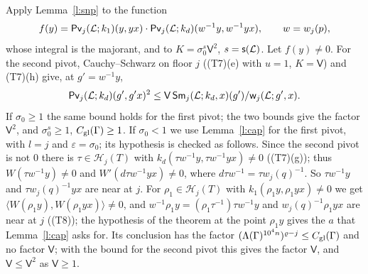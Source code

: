 \documentclass[11pt,a4paper]{article}
\makeatletter
\theoremstyle{plainx}
\theoremstyle{uprightx}
\renewenvironment{proof}[1][Proof]{\par\pushQED{\qed}\normalfont\topsep0pt\partopsep0pt
  \trivlist\item[\hskip\labelsep\itshape #1.]\ignorespaces}{\popQED\endtrivlist\@endpefalse}
\newcommand{\cL}{\mathcal{L}}
\newcommand{\Hl}[2]{\mathcal{H}_{#1}(#2)}
\newcommand{\wl}[2]{w_{#1}(#2)}
\newcommand{\ip}[2]{\langle #1,#2\rangle}
\newcommand{\Inp}[1]{\textup{(#1)}}
\makeatother
\begin{document}
\begin{proof}[Proof of Theorem A\textup{(a)}]
Apply Lemma~\ref{l:snp} to the function
\[f(y)=\pivotModulus{\cL}{j}{k_1}{y}{yx}\cdot\pivotModulus{\cL}{j}{k_d}{w^{-1}y}{w^{-1}yx},\qquad w=\wl{j}{p},\]
whose integral is the majorant, and to $K=\sigma_0^{s}\mathsf{V}^{2}$, $s=\volumeExponent{\cL}$. Let
$f(y)\ne0$. For the second pivot, Cauchy--Schwarz on floor $j$ (\Inp{T7}(e) with $u=1$, $K=\mathsf{V}$) and
\Inp{T7}(h) give, at $g'=w^{-1}y$,
\[\pivotModulus{\cL}{j}{k_d}{g'}{g'x}^2\le\mathsf{V}\,\weightedSquareSum{\cL}{k_d}{x}{j}{g'}/\floorWeight{\cL}{j}{g'}{x}.\]
If $\sigma_0\ge1$ the same bound holds for the first pivot; the two bounds give the factor $\mathsf{V}^{2}$, and
$\sigma_0^{s}\ge1$, $C_{\mathrm{gl}}(\Gamma)\ge1$. If $\sigma_0<1$ we use Lemma~\ref{l:cap} for the first pivot, with $l=j$
and $\varepsilon=\sigma_0$; its hypothesis is checked as follows. Since the second pivot is not $0$ there is $\tau\in\Hl{j}{T}$ with
$k_d(\tau w^{-1}y,\tau w^{-1}yx)\ne0$ (\Inp{T7}(g)); thus $W(\tau w^{-1}y)\ne0$ and $W'(d\tau w^{-1}yx)\ne0$, where
$d\tau w^{-1}=\tau\wl{j}{q}^{-1}$. So $\tau w^{-1}y$ and $\tau\wl{j}{q}^{-1}yx$ are near at $j$. For
$\rho_1\in\Hl{j}{T}$ with $k_1(\rho_1y,\rho_1yx)\ne0$ we get $\ip{W(\rho_1y)}{W(\rho_1yx)}\ne0$, and
$w^{-1}\rho_1y=(\rho_1\tau^{-1})\tau w^{-1}y$ and $\wl{j}{q}^{-1}\rho_1yx$ are near at $j$ (\Inp{T8}); the
hypothesis of the theorem at the point $\rho_1y$ gives the $a$ that Lemma~\ref{l:cap} asks for. Its conclusion
has the factor $(\Lambda(\Gamma)^{10^4n})^{\varrho-j}\le C_{\mathrm{gl}}(\Gamma)$ and no factor $\mathsf{V}$; with the bound
for the second pivot this gives the factor $\mathsf{V}$, and $\mathsf{V}\le\mathsf{V}^{2}$ as $\mathsf{V}\ge1$.
\end{proof}
\end{document}
